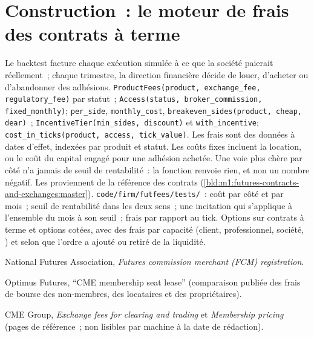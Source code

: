 \section{Construction~: le moteur de frais des contrats à terme}\label{bld:m1:getting-access-futures-options:futfees}

\begin{build}
 Le backtest facture chaque exécution simulée à ce que la
société paierait réellement~; chaque trimestre, la direction financière décide
de louer, d'acheter ou d'abandonner des adhésions.
 \texttt{ProductFees(product, exchange\_fee, regulatory\_fee)}
par statut~; \texttt{Access(status, broker\_commission, fixed\_monthly)}; \texttt{per\_side}, \texttt{monthly\_cost}, \texttt{breakeven\_sides(product,
cheap, dear)}~; \texttt{IncentiveTier(min\_sides, discount)} et
\texttt{with\_incentive}; \texttt{cost\_in\_ticks(product, access, tick\_value)}.
 Les frais sont des données à dates d'effet, indexées par produit et
statut. Les coûts fixes incluent la location, ou le coût du capital engagé pour
une adhésion achetée. Une voie plus chère par côté n'a jamais de seuil de rentabilité~: la
fonction renvoie rien, et non un nombre négatif. Les  proviennent de la
référence des contrats (\cref{bld:m1:futures-contracts-and-exchanges:master}).
 \texttt{code/firm/futfees/tests/}~: coût par côté
et par mois~; seuil de rentabilité dans les deux sens~; une incitation qui s'applique à
l'ensemble du mois à son seuil~; frais par rapport au tick.
 Options sur contrats à terme et options cotées, avec des frais par
capacité (client, professionnel, société, ) et selon que
l'ordre a ajouté ou retiré de la liquidité.
\end{build}

\begin{omsources}
\item National Futures Association, \emph{Futures commission merchant (FCM)
registration}.
\item Optimus Futures, ``CME membership seat lease'' (comparaison publiée des
frais de bourse des non-membres, des locataires et des propriétaires).
\item CME Group, \emph{Exchange fees for clearing and trading} et
\emph{Membership pricing} (pages de référence~; non lisibles par machine à la date
de rédaction).
\end{omsources}

